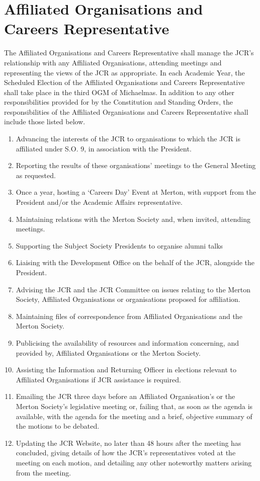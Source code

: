 \section{Affiliated Organisations and Careers Representative}
\npara The Affiliated Organisations and Careers Representative shall manage the JCR's relationship with any Affiliated Organisations, attending meetings and representing the views of the JCR as appropriate.
\npara In each Academic Year, the Scheduled Election of the Affiliated Organisations and Careers Representative shall take place in the third OGM of Michaelmas.
\npara In addition to any other responsibilities provided for by the Constitution and Standing Orders, the responsibilities of the Affiliated Organisations and Careers Representative shall include those listed below.
\begin{enumerate}
	\item Advancing the interests of the JCR to organisations to which the JCR is affiliated under S.O. 9, in association with the President.     
	\item Reporting the results of these organisations' meetings to the General Meeting as requested.
	\item Once a year, hosting a `Careers Day' Event at Merton, with support from the President and/or the Academic Affairs representative.
	\item Maintaining relations with the Merton Society and, when invited, attending meetings.
	\item Supporting the Subject Society Presidents to organise alumni talks
	\item Liaising with the Development Office on the behalf of the JCR, alongside the President.
	\item Advising the JCR and the JCR Committee on issues relating to the Merton Society, Affiliated Organisations or organisations proposed for affiliation.
	\item Maintaining files of correspondence from Affiliated Organisations and the Merton Society.
	\item Publicising the availability of resources and information concerning, and provided by, Affiliated Organisations or the Merton Society.
	\item Assisting the Information and Returning Officer in elections relevant to Affiliated Organisations if JCR assistance is required.
	\item Emailing the JCR three days before an Affiliated Organisation's or the Merton Society's legislative meeting or, failing that, as soon as the agenda is available, with the agenda for the meeting and a brief, objective summary of the motions to be debated.
	\item Updating the JCR Website, no later than 48 hours after the meeting has concluded, giving details of how the JCR's representatives voted at the meeting on each motion, and detailing any other noteworthy matters arising from the meeting.
\end{enumerate}
